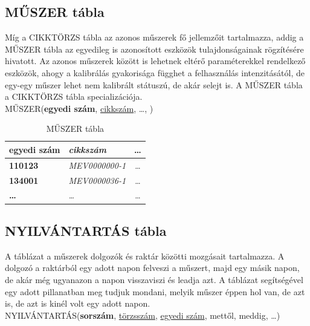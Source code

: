 \documentclass[a4paper,12pt]{report}
\newcommand{\pk}[1]{\textbf{#1}} %
\newcommand{\fk}[1]{\underline{#1}} %
\newcommand{\tabla}[1]{\noindent\MakeUppercase{#1}} %
\begin{document}
\subsection{MŰSZER tábla}
Míg a \tabla{CIKKTÖRZS} tábla az azonos műszerek fő jellemzőit tartalmazza, addig a \tabla{műszer} tábla az egyedileg is azonosított eszközök tulajdonságainak rögzítésére hivatott.
Az azonos műszerek között is lehetnek eltérő paraméterekkel rendelkező eszközök, ahogy a kalibrálás gyakorisága függhet a felhasználás intenzitásától, de egy-egy műszer lehet nem kalibrált státuszú, de akár selejt is.
A \tabla{MŰSZER} tábla a \tabla{cikktörzs} tábla specializációja.\\

\tabla{műszer}(\pk{egyedi szám}, \fk{cikkszám}, \dots, )

\begin{table}[ht!]
	\centering
	\begin{footnotesize}
	\begin{tabular}[t]{|l|l|c|}
		\hline
		\textbf{egyedi szám}&\textit{cikkszám}&\dots \\ \hline
		\textbf{110123}&\textit{MEV0000000-1}&\dots\\
		\textbf{134001}&\textit{MEV0000036-1}&\dots\\
		\textbf{\dots}&\textit{\dots}&\dots\\
	\end{tabular}
\end{footnotesize}
	\caption{MŰSZER tábla}\label{tabMUSZER}
\end{table}


\subsection{NYILVÁNTARTÁS tábla}
A táblázat a műszerek dolgozók és raktár közötti mozgásait tartalmazza. A dolgozó a raktárból egy adott napon felveszi a műszert, majd egy másik napon, de akár még ugyanazon a napon visszaviszi és leadja azt. A táblázat segítségével egy adott pillanatban meg tudjuk mondani, melyik műszer éppen hol van, de azt is, de azt is kinél volt egy adott napon. \\

\tabla{nyilvántartás}(\pk{sorszám}, \fk{törzsszám}, \fk{egyedi szám}, mettől, meddig, \dots)\\
\end{document}
